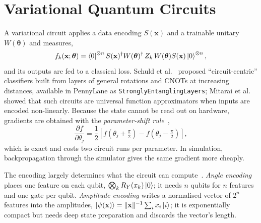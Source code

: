 \section{Variational Quantum Circuits}
\label{sec:rw_vqc}
A variational circuit applies a data encoding $S(\mathbf{x})$ and a
trainable unitary $W(\boldsymbol{\theta})$ and measures,
\begin{equation}
f_k(\mathbf{x};\boldsymbol{\theta}) =
\left\langle0\right|^{\otimes n} S(\mathbf{x})^\dagger W(\boldsymbol{\theta})^\dagger\,
Z_k\, W(\boldsymbol{\theta}) S(\mathbf{x}) \left|0\right\rangle^{\otimes n},
\label{eq:vqc}
\end{equation}
and its outputs are fed to a classical loss. Schuld et
al.~\cite{schuld2020circuit} proposed ``circuit-centric'' classifiers built
from layers of general rotations and CNOTs at increasing distances, available
in PennyLane as \texttt{StronglyEntanglingLayers}; Mitarai et
al.~\cite{mitarai2018} showed that such circuits are universal function
approximators when inputs are encoded non-linearly. Because the state
cannot be read out on hardware, gradients are obtained with the
\emph{parameter-shift rule}~\cite{mitarai2018, schuld2019grad},
\begin{equation}
\frac{\partial f}{\partial \theta_j} =
\frac{1}{2}\left[ f\!\left(\theta_j + \tfrac{\pi}{2}\right) -
f\!\left(\theta_j - \tfrac{\pi}{2}\right) \right],
\label{eq:pshift}
\end{equation}
which is exact and costs two circuit runs per parameter. In simulation,
backpropagation through the simulator gives the same gradient more cheaply.

\label{sec:rw_encoding}
The encoding largely determines what the circuit can
compute~\cite{schuld2019feature}. \emph{Angle encoding} places one feature on
each qubit, $\bigotimes_k R_Y(x_k)\left|0\right\rangle$; it needs $n$ qubits for $n$
features and one gate per qubit. \emph{Amplitude encoding} writes a
normalised vector of $2^n$ features into the amplitudes,
$\left|\psi(\mathbf{x})\right\rangle = \lVert\mathbf{x}\rVert^{-1}\sum_i x_i\left|i\right\rangle$; it is
exponentially compact but needs deep state preparation and discards the
vector's length.

